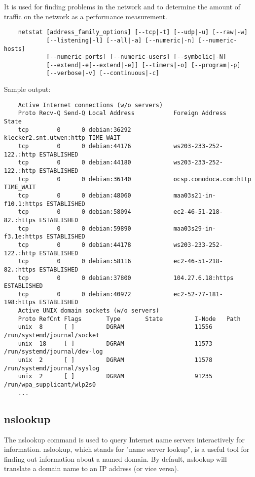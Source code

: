 \documentclass[a4paper,12pt]{article}
\begin{document}
    It is used for finding problems in the network and to determine the amount of traffic on the network as a performance measurement.
    
    \begin{verbatim}
    netstat [address_family_options] [--tcp|-t] [--udp|-u] [--raw|-w]
            [--listening|-l] [--all|-a] [--numeric|-n] [--numeric-hosts]
            [--numeric-ports] [--numeric-users] [--symbolic|-N]
            [--extend|-e[--extend|-e]] [--timers|-o] [--program|-p]
            [--verbose|-v] [--continuous|-c]
    \end{verbatim}
    
    Sample output:
    \begin{verbatim}
    Active Internet connections (w/o servers)
    Proto Recv-Q Send-Q Local Address           Foreign Address         State
    tcp        0      0 debian:36292            klecker2.snt.utwen:http TIME_WAIT
    tcp        0      0 debian:44176            ws203-233-252-122.:http ESTABLISHED
    tcp        0      0 debian:44180            ws203-233-252-122.:http ESTABLISHED
    tcp        0      0 debian:36140            ocsp.comodoca.com:http  TIME_WAIT
    tcp        0      0 debian:48060            maa03s21-in-f10.1:https ESTABLISHED
    tcp        0      0 debian:58094            ec2-46-51-218-82.:https ESTABLISHED
    tcp        0      0 debian:59890            maa03s29-in-f3.1e:https ESTABLISHED
    tcp        0      0 debian:44178            ws203-233-252-122.:http ESTABLISHED
    tcp        0      0 debian:58116            ec2-46-51-218-82.:https ESTABLISHED
    tcp        0      0 debian:37800            104.27.6.18:https       ESTABLISHED
    tcp        0      0 debian:40972            ec2-52-77-181-198:https ESTABLISHED
    Active UNIX domain sockets (w/o servers)
    Proto RefCnt Flags       Type       State         I-Node   Path
    unix  8      [ ]         DGRAM                    11556    /run/systemd/journal/socket
    unix  18     [ ]         DGRAM                    11573    /run/systemd/journal/dev-log
    unix  2      [ ]         DGRAM                    11578    /run/systemd/journal/syslog
    unix  2      [ ]         DGRAM                    91235    /run/wpa_supplicant/wlp2s0
    ...
    \end{verbatim}
    
    
    
    
    \subsection{nslookup}
    The nslookup command is used to query Internet name servers interactively for information.
    nslookup, which stands for "name server lookup", is a useful tool for finding out information about a named domain.
    By default, nslookup will translate a domain name to an IP address (or vice versa).
    
\end{document}
